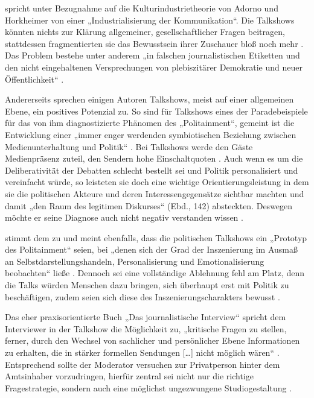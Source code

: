 \textcite{plakeTalkshowsIndustrialisierungKommunikation1999} spricht unter Bezugnahme auf die Kulturindustrietheorie von Adorno und Horkheimer von einer „Industrialisierung der Kommunikation“. Die Talkshows könnten nichts zur Klärung allgemeiner, gesellschaftlicher Fragen beitragen, stattdessen fragmentierten sie das Bewusstsein ihrer Zuschauer bloß noch mehr \textcite[144, passim]{plakeTalkshowsIndustrialisierungKommunikation1999}. Das Problem bestehe unter anderem „in falschen journalistischen Etiketten und den nicht eingehaltenen Versprechungen von plebiszitärer Demokratie und neuer Öffentlichkeit“ \textcite[11]{plakeTalkshowsIndustrialisierungKommunikation1999}.

Andererseits sprechen einigen Autoren Talkshows, meist auf einer allgemeinen Ebene, ein positives Potenzial zu. So sind für \textcite{doernerPolitainmentPolitikMedialen2001} Talkshows eines der Paradebeispiele für das von ihm diagnostizierte Phänomen des „Politainment“, gemeint ist die Entwicklung einer „immer enger werdenden symbiotischen Beziehung zwischen Medienunterhaltung und Politik“ \parencite[11]{doernerPolitainmentPolitikMedialen2001}. Bei Talkshows werde den Gäste Medienpräsenz zuteil, den Sendern hohe Einschaltquoten \parencite[135]{doernerPolitainmentPolitikMedialen2001}. Auch wenn es um die Deliberativität der Debatten schlecht bestellt sei und Politik personalisiert und vereinfacht würde, so leisteten sie doch eine wichtige Orientierungsleistung in dem sie die politischen Akteure und deren Interessengegensätze sichtbar machten \parencite[139\psq, 239\psq]{doernerPolitainmentPolitikMedialen2001} und damit „den Raum des legitimen Diskurses“ (Ebd., 142) absteckten. Deswegen möchte er seine Diagnose auch nicht negativ verstanden wissen \parencite[243\psq]{doernerPolitainmentPolitikMedialen2001}.

\textcite{bockPolitainmentImDeutschen2009} stimmt dem zu und meint ebenfalls, dass die politischen Talkshows ein „Prototyp des Politainment“ \parencite[52]{bockPolitainmentImDeutschen2009} seien, bei „denen sich der Grad der Inszenierung im Ausmaß an Selbstdarstellungshandeln, Personalisierung und Emotionalisierung beobachten“ ließe \parencite[52]{bockPolitainmentImDeutschen2009}. Dennoch sei eine vollständige Ablehnung fehl am Platz, denn die Talks würden Menschen dazu bringen, sich überhaupt erst mit Politik zu beschäftigen, zudem seien sich diese des Inszenierungscharakters bewusst \parencite[51\psqq]{bockPolitainmentImDeutschen2009}.

Das eher praxisorientierte Buch „Das journalistische Interview“ spricht dem Interviewer in der Talkshow die Möglichkeit zu, „kritische Fragen zu stellen, ferner, durch den Wechsel von sachlicher und persönlicher Ebene Informationen zu erhalten, die in stärker formellen Sendungen [\ldots] nicht möglich wären“ \parencite[269]{friedrichsJournalistischeInterview2009}. Entsprechend sollte der Moderator versuchen zur Privatperson hinter dem Amtsinhaber vorzudringen, hierfür zentral sei nicht nur die richtige Fragestrategie, sondern auch eine möglichst ungezwungene Studiogestaltung \parencite[276]{friedrichsJournalistischeInterview2009}.

